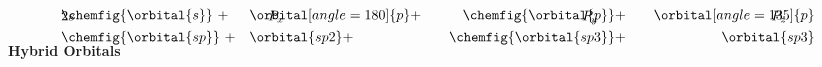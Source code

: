 \documentclass{article}
\begin{document}
\begin{align*}
&\chemfig{\orbital{s}} ~ + && \orbital[angle=180]{p} + &&& \chemfig{\orbital{p}} + &&&& \orbital[angle=135]{p} \\[-5mm]
&2s && \quad ~ P_x &&& P_y \quad\quad &&&& P_z\quad\quad \\
&\chemfig{\orbital{sp}} ~ + && \orbital{sp2} + &&& \chemfig{\orbital{sp3}} + &&&& \orbital{sp3} \\[-5mm]
\end{align*}
\begin{center}
\textbf{Hybrid Orbitals}
\end{center}
 
\end{document}

